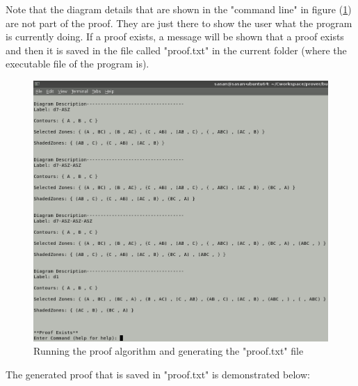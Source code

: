 \documentclass[10pt, a4paper, titlepage]{article}
\begin{document}
Note that the diagram details that are shown in the "command line" in figure (\ref{fig:proved}) are not part of the proof. They are just there to show the user what the program is currently doing. If a proof exists, a message will be shown that a proof exists and then it is saved in the file called "proof.txt" in the current folder (where the executable file of the program is).\\


\begin{figure}[h]
\centering
\includegraphics[scale=0.5]{images/ss3.png}
\caption{Running the proof algorithm and generating the "proof.txt" file}
\label{fig:proved}
\end{figure}

The generated proof that is saved in "proof.txt" is demonstrated below:
\end{document}

